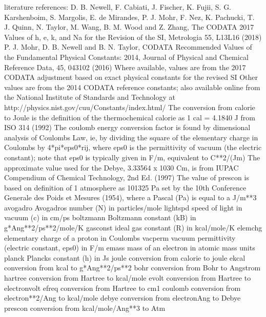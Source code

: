 \documentclass[letterpaper,11pt,english]{sphinxmanual}
\begin{document}

\begin{sphinxVerbatim}[commandchars=\\\{\}]
literature      references:
D.              B. Newell, F. Cabiati, J. Fischer, K. Fujii, S. G. Karshenboim,
S.              Margolis, E. de Mirandes, P. J. Mohr, F. Nez, K. Pachucki,
T.              J. Quinn, N. Taylor, M. Wang, B. M. Wood and Z. Zhang, \PYGZdq{}The
CODATA          2017 Values of h, e, k, and Na for the Revision of the SI\PYGZdq{},
Metrologia      55, L13\PYGZhy{}L16 (2018)
P.              J. Mohr, D. B. Newell and B. N. Taylor, \PYGZdq{}CODATA Recommended
Values          of the Fundamental Physical Constants: 2014\PYGZdq{}, Journal of
Physical        and Chemical Reference Data, 45, 043102 (2016)
Where           available, values are from the 2017 CODATA adjustment
based           on exact physical constants for the revised SI
Other           values are from the 2014 CODATA reference constants; also
available       online from the National Institute of Standards and
Technology      at http://physics.nist.gov/cuu/Constants/index.html/
The             conversion from calorie to Joule is the definition of the
thermochemical  calorie as 1 cal = 4.1840 J from ISO 31\PYGZhy{}4 (1992)
The             \PYGZdq{}coulomb\PYGZdq{} energy conversion factor is found by dimensional
analysis        of Coulomb\PYGZsq{}s Law, ie, by dividing the square of the
elementary      charge in Coulombs by 4*pi*eps0*rij, where eps0 is
the             permittivity of vacuum (the \PYGZdq{}electric constant\PYGZdq{}); note that
eps0            is typically given in F/m, equivalent to C**2/(J\PYGZhy{}m)
The             approximate value used for the Debye, 3.33564 x 10\PYGZhy{}30 C\PYGZhy{}m,
is              from IUPAC Compendium of Chemical Technology, 2nd Ed. (1997)
The             value of \PYGZdq{}prescon\PYGZdq{} is based on definition of 1 atmosphere
as              101325 Pa set by the 10th Conference Generale des Poids et
Mesures         (1954), where a Pascal (Pa) is equal to a J/m**3
avogadro        Avogadro\PYGZsq{}s number (N) in particles/mole
lightspd        speed of light in vacuum (c) in cm/ps
boltzmann       Boltzmann constant (kB) in g*Ang**2/ps**2/mole/K
gasconst        ideal gas constant (R) in kcal/mole/K
elemchg         elementary charge of a proton in Coulombs
vacperm         vacuum permittivity (electric constant, eps0) in F/m
emass           mass of an electron in atomic mass units
planck          Planck\PYGZsq{}s constant (h) in J\PYGZhy{}s
joule           conversion from calorie to joule
ekcal           conversion from kcal to g*Ang**2/ps**2
bohr            conversion from Bohr to Angstrom
hartree         conversion from Hartree to kcal/mole
evolt           conversion from Hartree to electron\PYGZhy{}volt
efreq           conversion from Hartree to cm\PYGZhy{}1
coulomb         conversion from electron**2/Ang to kcal/mole
debye           conversion from electron\PYGZhy{}Ang to Debye
prescon         conversion from kcal/mole/Ang**3 to Atm
\end{sphinxVerbatim}
\end{document}
